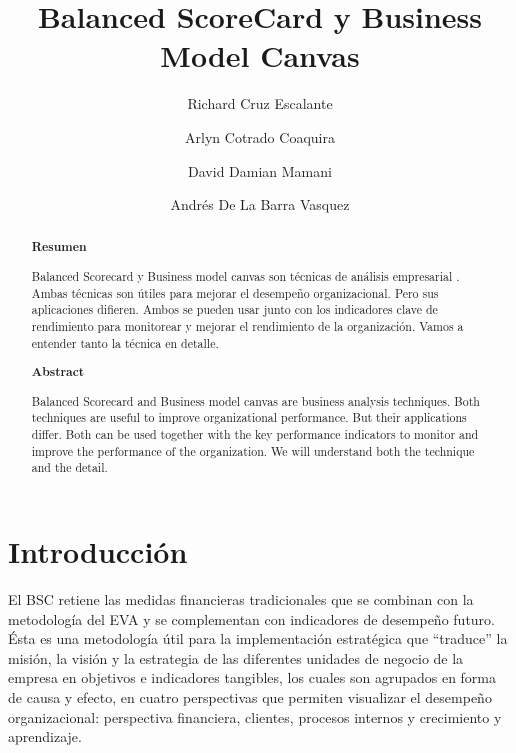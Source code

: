 \documentclass[%
 reprint,
 amsmath,amssymb,
 aps,
]{revtex4-1}
\begin{document}
\title{ Balanced ScoreCard y Business Model Canvas}
\author{Richard Cruz Escalante}
\author{Arlyn Cotrado Coaquira}
\author{David Damian Mamani}
\author{Andrés De La Barra Vasquez}
%

\begin{abstract}
\begin{center}
\textbf{Resumen}
\end{center}
Balanced Scorecard y Business model canvas son técnicas de análisis empresarial . Ambas técnicas son útiles para mejorar el desempeño organizacional. Pero sus aplicaciones difieren. Ambos se pueden usar junto con los indicadores clave de rendimiento para monitorear y mejorar el rendimiento de la organización. Vamos a entender tanto la técnica en detalle.


\begin{center}
\textbf{Abstract}
\end{center}
Balanced Scorecard and Business model canvas are business analysis techniques. Both techniques are useful to improve organizational performance. But their applications differ. Both can be used together with the key performance indicators to monitor and improve the performance of the organization. We will understand both the technique and the detail.

\end{abstract}



\maketitle


\section {Introducción}

El BSC retiene las medidas financieras tradicionales que se combinan con la metodología del EVA y se complementan con indicadores de desempeño futuro.\\
Ésta es una metodología útil para la implementación estratégica que “traduce” la misión, la visión y la estrategia de las diferentes unidades de negocio de la\\
empresa en objetivos e indicadores tangibles, los cuales son agrupados en forma de causa y efecto, en cuatro perspectivas que permiten visualizar el desempeño\\
organizacional: perspectiva financiera, clientes, procesos internos y crecimiento y aprendizaje.\\
\end{document}
